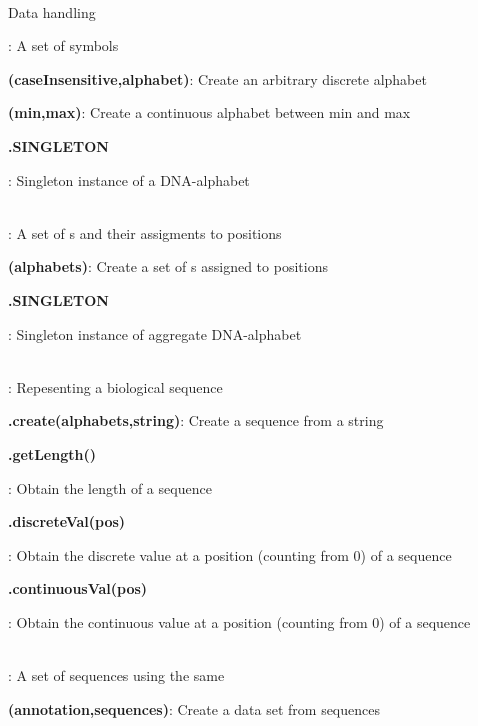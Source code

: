 \documentclass[10pt]{scrartcl}
\newcommand{\entry}[3]{{\item[]\bfseries #1#2}: #3}
\newcommand{\entrys}[3]{\item[\emph{static}] {\bfseries {#1#2}}: #3}
\newcommand{\entryn}[3]{\item[new] {\bfseries {#1#2}}: #3}
\newcommand{\sep}{\\~\vspace{-0.1cm}}
\begin{document}
\thispagestyle{empty}


\renewcommand{\section}[1]{{
~\vspace{-0.2cm}

\large\sfb #1\\}


}
\begin{flushleft}
\footnotesize
\section{Data handling}
\begin{itemize*}
\entry{\Alphabet}{}{A set of symbols}

\entryn{\DiscreteAlphabet}{(caseInsensitive,alphabet)}{Create an arbitrary discrete alphabet}

\entryn{\ContinuousAlphabet}{(min,max)}{Create a continuous alphabet between min and max}

\entry{\DNAAlphabet}{.SINGLETON}{Singleton instance of a DNA-alphabet}\sep

\entry{\AlphabetContainer}{}{A set of \Alphabet s and their assigments to positions}

\entryn{\AlphabetContainer}{(alphabets)}{Create a set of \Alphabet s assigned to positions}

\entry{\DNAAlphabetContainer}{.SINGLETON}{Singleton instance of aggregate DNA-alphabet}\sep

\entry{\Sequence}{}{Repesenting a biological sequence}

\entrys{\Sequence}{.create(alphabets,string)}{Create a sequence from a string}

\entry{\Sequence}{.getLength()}{Obtain the length of a sequence}

\entry{\Sequence}{.discreteVal(pos)}{Obtain the discrete value at a position (counting from 0) of a sequence}

\entry{\Sequence}{.continuousVal(pos)}{Obtain the continuous value at a position (counting from 0) of a sequence}\sep

\entry{\DataSet}{}{A set of sequences using the same \AlphabetContainer}

\entryn{\DataSet}{(annotation,sequences)}{Create a data set from sequences}


\end{itemize*}
\end{flushleft}
\end{document}

